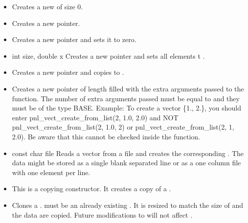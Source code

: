 \begin{itemize}
  \item {}
  \sshortdescribe Creates a new  of size 0.  
\item {}
  \sshortdescribe Creates a new  pointer.  
\item {}
  \sshortdescribe Creates a new  pointer and sets it to zero.  
\item {}
  {int size, double x}
  \sshortdescribe Creates a new  pointer and sets all
  elements t .  
\item {}
  \sshortdescribe Creates a new  pointer and copies 
  to .  
\item {}
  \sshortdescribe Creates a new  pointer of length
   filled with the extra arguments passed to the function. The
  number of extra arguments passed must be equal to  and they must be of the type BASE.
  Example: To create a vector \{1., 2.\}, you should enter pnl_vect_create_from_list(2, 1.0, 2.0) and NOT pnl_vect_create_from_list(2, 1.0, 2) or pnl_vect_create_from_list(2, 1, 2.0).
  Be aware that this cannot be checked inside the function.
\item {}
  {const char \ptr file}
  \sshortdescribe Reads a vector from a file and creates the corresponding
  . The data might be stored as a single blank separated line
  or as a one column file with one element per line.

\item {}
  \sshortdescribe This is a copying constructor. It creates a copy of a .
\item {} 
  \sshortdescribe Clones a .  must be an
  already existing  . It is resized to match the size of
   and the data are copied. Future modifications to  will not
  affect .


\end{itemize}
